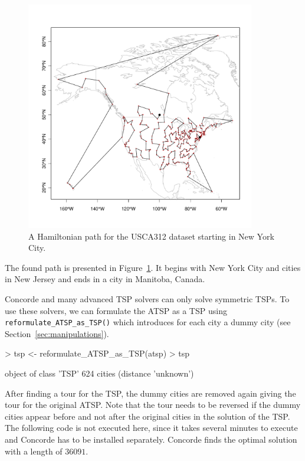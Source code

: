 \documentclass[10pt,a4paper,fleqn]{article}
\newcommand{\func}[1]{\mbox{\texttt{#1()}}}
\begin{document}
\begin{figure}
\centering
\includegraphics[width=10cm, trim=0 30 0 0]{TSP-map2}
\caption{A Hamiltonian path for the USCA312 dataset starting in New York City.}
\label{fig:map2}
\end{figure}

The found path  is presented in Figure~\ref{fig:map2}. It begins with New York
City and cities in New Jersey and ends in a city in Manitoba, Canada. 

Concorde and many advanced TSP solvers can only solve symmetric TSPs. To use
these solvers, we can formulate the ATSP as a TSP using \func{reformulate\_ATSP\_as\_TSP}
which introduces for each city a dummy city (see
Section~\ref{sec:manipulations}).  

\begin{Schunk}
\begin{Sinput}
> tsp <- reformulate_ATSP_as_TSP(atsp)
> tsp
\end{Sinput}
\begin{Soutput}
object of class 'TSP' 
624 cities (distance 'unknown') 
\end{Soutput}
\end{Schunk}

After finding a tour for the TSP, the dummy cities are removed again giving the
tour for the original ATSP.  
Note that the tour needs to be reversed if the
dummy cities appear before and not after the original cities in the solution of
the TSP.  The following code is not executed here, since it takes several
minutes to execute and Concorde has to be installed separately.  Concorde finds
the optimal solution with a length of $36091$.
\end{document}
